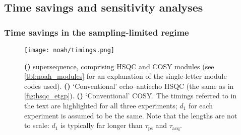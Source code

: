 \subsection{Time savings and sensitivity analyses}
\label{subsec:noah__snr}


\subsubsection{Time savings in the sampling-limited regime}

\begin{figure}[htb]
    \centering
    \texttt{[image: noah/timings.png]}%
    {\label{fig:noah_timings_noah_sc}}%
    {\label{fig:noah_timings_conv_s}}%
    {\label{fig:noah_timings_conv_c}}%
    \caption[Comparison of NOAH and conventional 2D experiments]{
        \textbf{()}  supersequence, comprising HSQC and COSY modules (see \cref{tbl:noah_modules} for an explanation of the single-letter module codes used).
        \textbf{()} `Conventional' echo--antiecho HSQC (the same as in \cref{fig:hsqc_etgp}).
        \textbf{()} `Conventional' COSY.
        The timings referred to in the text are highlighted for all three experiments; $d_1$ for each experiment is assumed to be the same.
        Note that the lengths are not to scale: $d_1$ is typically far longer than $\tau_\text{ps}$ and $\tau_\text{acq}$.
    }
    \label{fig:noah_timings}
\end{figure}


